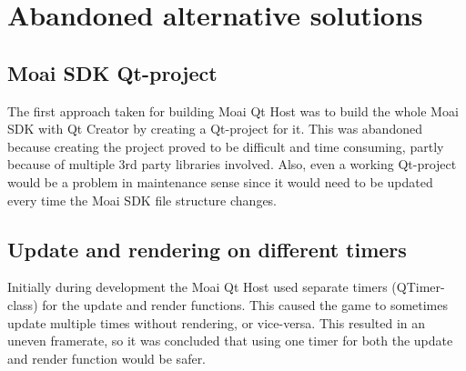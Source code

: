 \chapter{Abandoned alternative solutions}

\section{Moai SDK Qt-project}
\label{qtproject}

The first approach taken for building Moai Qt Host was to build the whole Moai SDK with Qt Creator by creating a Qt-project for it.
This was abandoned because creating the project proved to be difficult and time consuming, partly because of multiple 3rd party libraries involved.
Also, even a working Qt-project would be a problem in maintenance sense since it would need to be updated every time the Moai SDK file structure changes.

\section{Update and rendering on different timers}

Initially during development the Moai Qt Host used separate timers (QTimer-class) for the update and render functions.
This caused the game to sometimes update multiple times without rendering, or vice-versa.
This resulted in an uneven framerate, so it was concluded that using one timer for both the update and render function would be safer.

